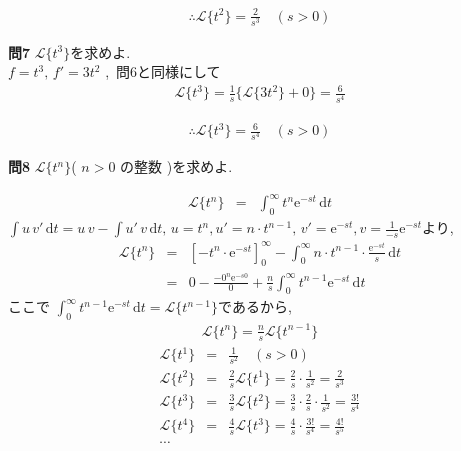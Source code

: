 ﻿\documentclass[a4j]{jarticle}
\begin{document}
\begin{eqnarray*}
\therefore \mathcal{L} \{ t^2 \} =  \frac{2}{s^3} \quad(s>0)
\end{eqnarray*}

\noindent
{\large {\bf 問7}}\/ \( \mathcal{L} \{ t^3 \} \)を求めよ. \\

\( f=t^3 ,\, f'=3t^2 \) ,\, 問6と同様にして
\begin{eqnarray*}
\mathcal{L} \{ t^3 \} = \frac{1}{s} \{ \mathcal{L} \{ 3t^2 \} + 0 \} = \frac{6}{s^4}
\end{eqnarray*}

\begin{eqnarray*}
\therefore \mathcal{L} \{ t^3 \} =  \frac{6}{s^4} \quad(s>0)
\end{eqnarray*}

\noindent
{\large {\bf 問8}}\/ \( \mathcal{L} \{ t^n \} \)\quad( \( n > 0\) の整数 )を求めよ.

\begin{eqnarray*}
\mathcal{L} \{ t^n \} &=& \int_0^\infty{ t^n \mathrm{e}^{-st} \, \mathrm{d}t }
\end{eqnarray*}
%
\( \int{ u\,v' } \, \mathrm{d}t = u\,v - \int{ u'\,v } \, \mathrm{d}t ,\, u=t^n , u'=n\cdot t^{n-1} ,\, v'=\mathrm{e}^{-st}, v=\frac{1}{-s}\mathrm{e}^{-st} \)より,
%
\begin{eqnarray*}
\mathcal{L} \{ t^n \} &=& \left[ -t^n \cdot \mathrm{e}^{-st} \right]_0^\infty - \int_0^\infty{n \cdot t^{n-1} \cdot \frac{\mathrm{e}^{-st}}{s} \, \mathrm{d}t} \\
                      &=& 0 - \frac{-0^n \mathrm{e}^{-s0}}{0} + \frac{n}{s}\int_0^\infty{t^{n-1}\mathrm{e}^{-st}\, \mathrm{d}t }
\end{eqnarray*}
ここで \(\int_0^\infty{t^{n-1}\mathrm{e}^{-st}\, \mathrm{d}t } = \mathcal{L} \{ t^{n-1} \} \)であるから,
\begin{eqnarray*}
\mathcal{L} \{ t^{n} \} = \frac{n}{s}\mathcal{L} \{ t^{n-1} \}
\end{eqnarray*}
%
\begin{eqnarray*}
\mathcal{L} \{ t^{1} \} &=& \frac{1}{s^2}\quad(s>0) \\
\mathcal{L} \{ t^{2} \} &=& \frac{2}{s}\mathcal{L} \{ t^{1} \} = \frac{2}{s}\cdot\frac{1}{s^2} = \frac{2}{s^3} \\
\mathcal{L} \{ t^{3} \} &=& \frac{3}{s}\mathcal{L} \{ t^{2} \} = \frac{3}{s}\cdot\frac{2}{s}\cdot\frac{1}{s^2} = \frac{3!}{s^4} \\
\mathcal{L} \{ t^{4} \} &=& \frac{4}{s}\mathcal{L} \{ t^{3} \} = \frac{4}{s}\cdot\frac{3!}{s^4}=\frac{4!}{s^5} \\
\dotsi
\end{eqnarray*}
\end{document}
